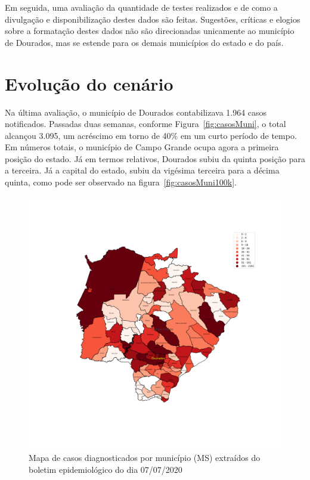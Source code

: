\documentclass[12pt]{article}
\begin{document}
Em seguida, uma avaliação da quantidade de testes realizados e de como a divulgação e disponibilização destes dados são feitas. Sugestões, críticas e elogios sobre a formatação destes dados não são direcionadas unicamente ao município de Dourados, mas se estende para os demais municípios do estado e do país.

\section{Evolução do cenário}\label{sec:dados}

Na última avaliação, o município de Dourados contabilizava 1.964 casos notificados. Passadas duas semanas, conforme Figura~\ref{fig:casosMuni}, o total alcançou 3.095, um acréscimo em torno de 40\% em um curto período de tempo. Em números totais, o município de Campo Grande ocupa agora a primeira posição do estado. Já em termos relativos, Dourados subiu da quinta posição para a terceira. Já a capital do estado, subiu da vigésima terceira para a décima quinta, como pode ser observado na figura~\ref{fig:casosMuni100k}.

\begin{figure}[!htb]
  \centering
  \includegraphics[width=1\textwidth]{figs/mapa_casos_registrados.png}
  \caption{Mapa de casos diagnosticados por município (MS) extraídos do boletim epidemiológico do dia 07/07/2020}
  \label{fig:mapaCasos}
  \end{figure}
\end{document}
